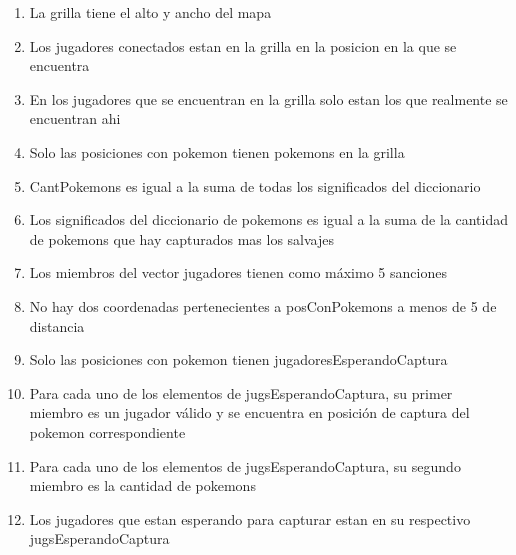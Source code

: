 \begin{Representacion}
\begin{enumerate}
		\item La grilla tiene el alto y ancho del mapa 

		\item Los jugadores conectados estan en la grilla en la posicion en la que se encuentra 

		\item En los jugadores que se encuentran en la grilla solo estan los que realmente se encuentran ahi 

		\item Solo las posiciones con pokemon tienen pokemons en la grilla

		\item CantPokemons es igual a la suma de todas los significados del diccionario 

		\item Los significados del diccionario de pokemons es igual a la suma de la cantidad de pokemons que hay capturados mas los salvajes 

		\item Los miembros del vector jugadores tienen como máximo 5 sanciones 

		\item No hay dos coordenadas pertenecientes a posConPokemons a menos de 5 de distancia

		\item Solo las posiciones con pokemon tienen jugadoresEsperandoCaptura

		\item Para cada uno de los elementos de jugsEsperandoCaptura, su primer miembro es un jugador válido y se encuentra en posición de captura del pokemon correspondiente

		\item Para cada uno de los elementos de jugsEsperandoCaptura, su segundo miembro es la cantidad de pokemons

		\item Los jugadores que estan esperando para capturar estan en su respectivo jugsEsperandoCaptura



	\end{enumerate}


	\Rep[pokego][e]{

}
\end{Representacion}
